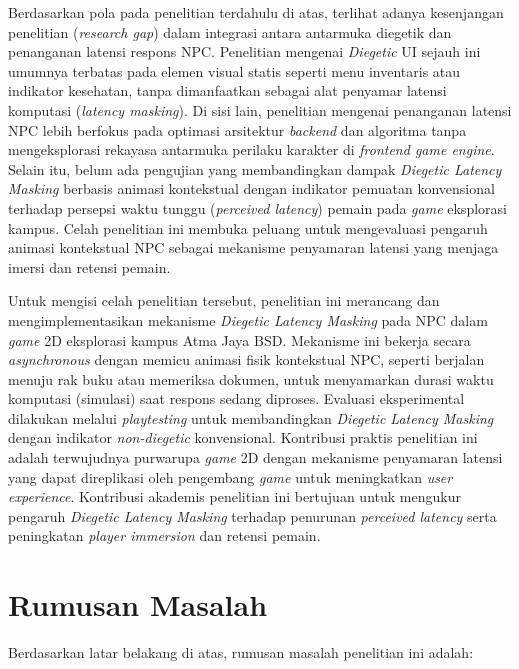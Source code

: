 Berdasarkan pola pada penelitian terdahulu di atas, terlihat adanya kesenjangan penelitian (\textit{research gap}) dalam integrasi antara antarmuka diegetik dan penanganan latensi respons NPC. Penelitian mengenai \textit{Diegetic} UI sejauh ini umumnya terbatas pada elemen visual statis seperti menu inventaris atau indikator kesehatan, tanpa dimanfaatkan sebagai alat penyamar latensi komputasi (\textit{latency masking}). Di sisi lain, penelitian mengenai penanganan latensi NPC lebih berfokus pada optimasi arsitektur \textit{backend} dan algoritma tanpa mengeksplorasi rekayasa antarmuka perilaku karakter di \textit{frontend game engine}. Selain itu, belum ada pengujian yang membandingkan dampak \textit{Diegetic Latency Masking} berbasis animasi kontekstual dengan indikator pemuatan konvensional terhadap persepsi waktu tunggu (\textit{perceived latency}) pemain pada \textit{game} eksplorasi kampus. Celah penelitian ini membuka peluang untuk mengevaluasi pengaruh animasi kontekstual NPC sebagai mekanisme penyamaran latensi yang menjaga imersi dan retensi pemain.

Untuk mengisi celah penelitian tersebut, penelitian ini merancang dan mengimplementasikan mekanisme \textit{Diegetic Latency Masking} pada NPC dalam \textit{game} 2D eksplorasi kampus Atma Jaya BSD. Mekanisme ini bekerja secara \textit{asynchronous} dengan memicu animasi fisik kontekstual NPC, seperti berjalan menuju rak buku atau memeriksa dokumen, untuk menyamarkan durasi waktu komputasi (simulasi) saat respons sedang diproses. Evaluasi eksperimental dilakukan melalui \textit{playtesting} untuk membandingkan \textit{Diegetic Latency Masking} dengan indikator \textit{non-diegetic} konvensional. Kontribusi praktis penelitian ini adalah terwujudnya purwarupa \textit{game} 2D dengan mekanisme penyamaran latensi yang dapat direplikasi oleh pengembang \textit{game} untuk meningkatkan \textit{user experience}. Kontribusi akademis penelitian ini bertujuan untuk mengukur pengaruh \textit{Diegetic Latency Masking} terhadap penurunan \textit{perceived latency} serta peningkatan \textit{player immersion} dan retensi pemain.

\section{Rumusan Masalah}
Berdasarkan latar belakang di atas, rumusan masalah penelitian ini adalah:

